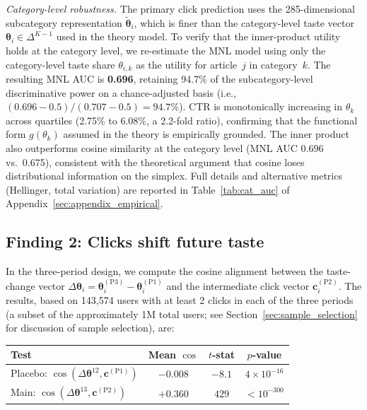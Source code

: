 \documentclass[11pt]{article}
\begin{document}
\emph{Category-level robustness.} The primary click prediction uses the 285-dimensional subcategory representation $\tilde{\boldsymbol{\theta}}_i$, which is finer than the category-level taste vector $\boldsymbol{\theta}_i \in \Delta^{K-1}$ used in the theory model. To verify that the inner-product utility holds at the category level, we re-estimate the MNL model using only the category-level taste share $\theta_{i,k}$ as the utility for article~$j$ in category~$k$. The resulting MNL AUC is \textbf{0.696}, retaining 94.7\% of the subcategory-level discriminative power on a chance-adjusted basis (i.e., $(0.696-0.5)/(0.707-0.5) = 94.7\%$). CTR is monotonically increasing in $\theta_k$ across quartiles (2.75\% to 6.08\%, a 2.2-fold ratio), confirming that the functional form $g(\theta_k)$ assumed in the theory is empirically grounded. The inner product also outperforms cosine similarity at the category level (MNL AUC 0.696 vs.\ 0.675), consistent with the theoretical argument that cosine loses distributional information on the simplex. Full details and alternative metrics (Hellinger, total variation) are reported in Table~\ref{tab:cat_auc} of Appendix~\ref{sec:appendix_empirical}.

\subsection{Finding 2: Clicks shift future taste}

In the three-period design, we compute the cosine alignment between the taste-change vector $\Delta\boldsymbol{\theta}_i = \boldsymbol{\theta}_i^{(\text{P3})} - \boldsymbol{\theta}_i^{(\text{P1})}$ and the intermediate click vector $\mathbf{c}_i^{(\text{P2})}$. The results, based on 143,574 users with at least 2 clicks in each of the three periods (a subset of the approximately 1M total users; see Section~\ref{sec:sample_selection} for discussion of sample selection), are:

\begin{center}
\begin{tabular}{lccc}
\toprule
Test & Mean $\cos$ & $t$-stat & $p$-value \\
\midrule
Placebo: $\cos(\Delta\boldsymbol{\theta}^{12}, \mathbf{c}^{(\text{P1})})$ & $-0.008$ & $-8.1$ & $4 \times 10^{-16}$ \\
Main: $\cos(\Delta\boldsymbol{\theta}^{13}, \mathbf{c}^{(\text{P2})})$ & $+0.360$ & $429$ & $< 10^{-300}$ \\
\bottomrule
\end{tabular}
\end{center}
\end{document}
